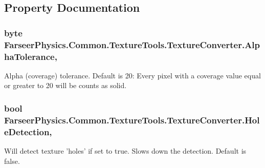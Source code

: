 \subsection{Property Documentation}
\hypertarget{class_farseer_physics_1_1_common_1_1_texture_tools_1_1_texture_converter_a9cd8c2626f9dd33e1d181af04439766b}{
\subsubsection[{Alpha\+Tolerance}]{\setlength{\rightskip}{0pt plus 5cm}byte Farseer\+Physics.\+Common.\+Texture\+Tools.\+Texture\+Converter.\+Alpha\+Tolerance\hspace{0.3cm}{\ttfamily [get]}, {\ttfamily [set]}}}\label{class_farseer_physics_1_1_common_1_1_texture_tools_1_1_texture_converter_a9cd8c2626f9dd33e1d181af04439766b}


Alpha (coverage) tolerance. Default is 20\+: Every pixel with a coverage value equal or greater to 20 will be counts as solid. 

\hypertarget{class_farseer_physics_1_1_common_1_1_texture_tools_1_1_texture_converter_a71f8b7b1315b5a7f050cccd090319602}{
\subsubsection[{Hole\+Detection}]{\setlength{\rightskip}{0pt plus 5cm}bool Farseer\+Physics.\+Common.\+Texture\+Tools.\+Texture\+Converter.\+Hole\+Detection\hspace{0.3cm}{\ttfamily [get]}, {\ttfamily [set]}}}\label{class_farseer_physics_1_1_common_1_1_texture_tools_1_1_texture_converter_a71f8b7b1315b5a7f050cccd090319602}


Will detect texture 'holes' if set to true. Slows down the detection. Default is false. 

